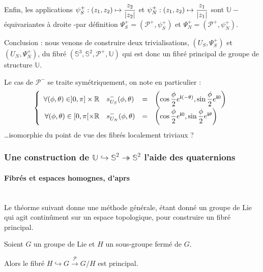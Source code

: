 \par
Enfin, les applications $\psi_S^+:(z_1,z_2)\mapsto\dfrac{z_2}{\lvert z_2\rvert}$ et $\psi_N^+:(z_1,z_2)\mapsto\dfrac{z_1}{\lvert z_1\rvert}$ sont $\mathbb{U}-$\'equivariantes \`a droite %
-par d\'efinition $\Psi_S^+=(\mathcal{P}^+,\psi_S^+)$ et $\Psi_N^+=(\mathcal{P}^+,\psi_N^+)$.

\ligneinter
Conclusion : nous venons de construire deux trivialisations, $(U_S,\Psi_S^+)$ et $(U_N,\Psi_N^+)$, du fibr\'e $(\mathbb{S}^3,\mathbb{S}^2,\mathcal{P}^+,\mathbb{U})$ %
qui est donc un fibr\'e principal de groupe de structure $\mathbb{U}$.

\etoile
Le cas de $\mathcal{P}^-$ se traite sym\'etriquement, on note en particulier :
\[\left\{\begin{array}{rlcl}%
\forall (\phi,\theta)\in ]0,\pi]\times\mathbb{R}&\se{S}{-}(\phi ,\theta )&=&\st{\phi}{(-\theta )}{0}\\%
\forall (\phi,\theta)\in [0,\pi [\times\mathbb{R}&\se{N}{-}(\phi ,\theta )&=&\st{\phi}{0}{\theta}\\%
\end{array}\right.\]
\dots isomorphie du point de vue des fibr\'es localement triviaux ?

\subsubsection{Une construction de $\mathbb{U}\hookrightarrow\mathbb{S}^2\twoheadrightarrow\mathbb{S}^2$  l'aide des quaternions}

\paragraph{Fibr\'es et espaces homognes, d'aprs \cite{ex_par}}~\\


Le th\'eorme suivant donne une m\'ethode g\'en\'erale, \'etant donn\'e un groupe de Lie qui agit contin\^ument sur un espace topologique, %
pour construire un fibr\'e principal.

\begin{theo}%
\label{esh}
Soient $G$ un groupe de Lie et $H$ un sous-groupe ferm\'e de $G$.

\par
Alors le fibr\'e $H\hookrightarrow G\xrightarrow{\mathcal{P}}G/H$ est principal.
\end{theo}

